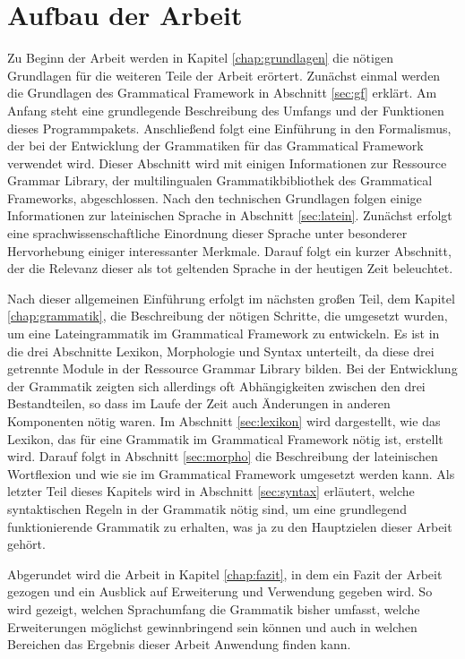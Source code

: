 \section{Aufbau der Arbeit}
\label{sec:aufbau}
Zu Beginn der Arbeit werden in Kapitel \ref{chap:grundlagen} die nötigen Grundlagen für die weiteren Teile der Arbeit erörtert. Zunächst einmal werden die Grundlagen des Grammatical Framework in Abschnitt \ref{sec:gf} erklärt. Am Anfang steht eine grundlegende Beschreibung des Umfangs und der Funktionen dieses Programmpakets. Anschließend folgt eine Einführung in den Formalismus, der bei der Entwicklung der Grammatiken für das Grammatical Framework verwendet wird. Dieser Abschnitt wird mit einigen Informationen zur Ressource Grammar Library, der multilingualen Grammatikbibliothek des Grammatical Frameworks, abgeschlossen. Nach den technischen Grundlagen folgen einige Informationen zur lateinischen Sprache in Abschnitt \ref{sec:latein}. Zunächst erfolgt eine sprachwissenschaftliche Einordnung dieser Sprache unter besonderer Hervorhebung einiger interessanter Merkmale. Darauf folgt ein kurzer Abschnitt, der die Relevanz dieser als tot geltenden Sprache in der heutigen Zeit beleuchtet. \par
Nach dieser allgemeinen Einführung erfolgt im nächsten großen Teil, dem Kapitel \ref{chap:grammatik}, die Beschreibung der nötigen Schritte, die umgesetzt wurden, um eine Lateingrammatik im Grammatical Framework zu entwickeln. Es ist in die drei Abschnitte Lexikon, Morphologie und Syntax unterteilt, da diese drei getrennte Module in der Ressource Grammar Library bilden. Bei der Entwicklung der Grammatik zeigten sich allerdings oft Abhängigkeiten zwischen den drei Bestandteilen, so dass im Laufe der Zeit auch Änderungen in anderen Komponenten nötig waren. Im Abschnitt \ref{sec:lexikon} wird dargestellt, wie das Lexikon, das für eine Grammatik im Grammatical Framework nötig ist, erstellt wird. Darauf folgt in Abschnitt \ref{sec:morpho} die Beschreibung der lateinischen Wortflexion und wie sie im Grammatical Framework umgesetzt werden kann. Als letzter Teil dieses Kapitels wird in Abschnitt \ref{sec:syntax} erläutert, welche syntaktischen Regeln in der Grammatik nötig sind, um eine grundlegend funktionierende Grammatik zu erhalten, was ja zu den Hauptzielen dieser Arbeit gehört. \par
Abgerundet wird die Arbeit in Kapitel \ref{chap:fazit}, in dem ein Fazit der Arbeit gezogen und ein Ausblick auf Erweiterung und Verwendung gegeben wird. So wird gezeigt, welchen Sprachumfang die Grammatik bisher umfasst, welche Erweiterungen möglichst gewinnbringend sein können und auch in welchen Bereichen das Ergebnis dieser Arbeit Anwendung finden kann.
